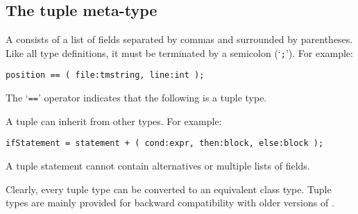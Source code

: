 \subsection{The tuple meta-type}
A  consists of a list of fields separated by commas and
surrounded by parentheses.
Like all type definitions, it must be terminated by a semicolon (`\verb';'').
For example:
\begin{verbatim}
position == ( file:tmstring, line:int );
\end{verbatim}
The `\verb'=='' operator indicates that the following is a tuple type.
\par
A tuple can inherit from other types. For example:
\begin{verbatim}
ifStatement = statement + ( cond:expr, then:block, else:block );
\end{verbatim}
A tuple statement cannot contain alternatives or multiple lists of fields.
\par
Clearly, every tuple type can be converted to an equivalent class type.
Tuple types are mainly provided for backward compatibility with
older versions of {\Tm}.
